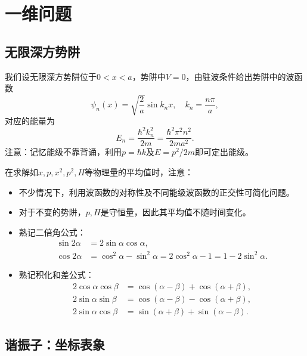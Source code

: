 \section{一维问题}

\subsection{无限深方势阱}

我们设无限深方势阱位于$0<x<a$，势阱中$V=0$，由驻波条件给出势阱中的波函数
\begin{equation}
    \psi_n(x) = \sqrt{\frac2a}\sin{k_n x}, \quad k_n = \frac{n\pi}{a},
\end{equation}
对应的能量为
\begin{equation}
    E_n = \frac{\hbar^2 k_n^2}{2m} = \frac{\hbar^2 \pi^2 n^2}{2ma^2}.
\end{equation}
注意：记忆能级不靠背诵，利用$p=\hbar k$及$E=p^2/2m$即可定出能级。

在求解如$x,p,x^2,p^2,H$等物理量的平均值时，注意：
\begin{itemize}
    \item 不少情况下，利用波函数的对称性及不同能级波函数的正交性可简化问题。
    \item 对于不变的势阱，$p,H$是守恒量，因此其平均值不随时间变化。
    \item 熟记二倍角公式：
    \begin{equation}
    \begin{aligned}
        \sin 2\alpha &= 2\sin\alpha\cos\alpha, \\
        \cos 2\alpha &= \cos^2\alpha - \sin^2\alpha = 2\cos^2\alpha - 1 = 1 - 2\sin^2\alpha.
    \end{aligned}
    \end{equation}
    \item 熟记积化和差公式：
    \begin{equation}
    \begin{aligned}
        2\cos\alpha\cos\beta &= \cos(\alpha-\beta) + \cos(\alpha+\beta), \\
        2\sin\alpha\sin\beta &= \cos(\alpha-\beta) - \cos(\alpha+\beta), \\
        2\sin\alpha\cos\beta &= \sin(\alpha+\beta) + \sin(\alpha-\beta).
    \end{aligned}
    \end{equation}
\end{itemize}

\subsection{谐振子：坐标表象}

